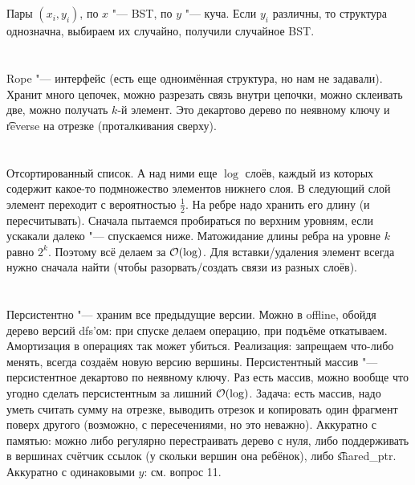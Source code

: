 \section{} %
Пары $(x_i, y_i)$, по $x$ "--- BST, по $y$ "--- куча.
Если $y_i$ различны, то структура однозначна, выбираем их случайно, получили случайное BST.

\section{} %
Rope "--- интерфейс (есть еще одноимённая структура, но нам не задавали).
Хранит много цепочек, можно разрезать связь внутри цепочки, можно склеивать две, можно получать $k$-й элемент.
Это декартово дерево по неявному ключу и \t{reverse} на отрезке (проталкивания сверху).

\section{} %
Отсортированный список.
А над ними еще $\log$ слоёв, каждый из которых содержит какое-то подмножество элементов нижнего слоя.
В следующий слой элемент переходит с вероятностью $\frac 1 2$.
На ребре надо хранить его длину (и пересчитывать).
Сначала пытаемся пробираться по верхним уровням, если ускакали далеко "--- спускаемся ниже.
Матожидание длины ребра на уровне $k$ равно $2^k$.
Поэтому всё делаем за $\mathcal{O}(\log)$.
Для вставки/удаления элемент всегда нужно сначала найти (чтобы разорвать/создать связи из разных слоёв).

\section{} %
Персистентно "--- храним все предыдущие версии.
Можно в offline, обойдя дерево версий dfs'ом: при спуске делаем операцию, при подъёме откатываем.
Амортизация в операциях так может убиться.
Реализация: запрещаем что-либо менять, всегда создаём новую версию вершины.
Персистентный массив "--- персистентное декартово по неявному ключу.
Раз есть массив, можно вообще что угодно сделать персистентным за лишний $\mathcal{O}(\log)$.
Задача: есть массив, надо уметь считать сумму на отрезке, выводить отрезок и копировать
один фрагмент поверх другого (возможно, с пересечениями, но это неважно).
Аккуратно с памятью: можно либо регулярно перестраивать дерево с нуля, либо поддерживать
в вершинах счётчик ссылок (у скольки вершин она ребёнок), либо \t{shared\_ptr}.
Аккуратно с одинаковыми $y$: см. вопрос 11.

